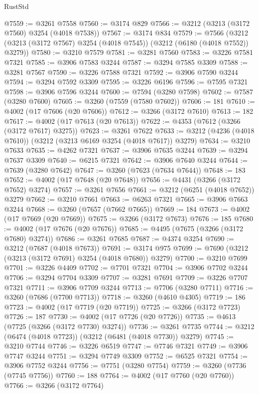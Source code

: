 \begin{lexlean}{RustStd}
\begin{coremodule}
@7559 := @3261 @7558
@7560 := @3174 @829
@7566 := @3212 (@3213 (@3172 @7560) @3254 (@4018 @7538))
@7567 := @3174 @834
@7579 := @7566 (@3212 (@3213 (@3172 @7567) @3254 (@4018 @7545)) (@3212 (@6180 (@4018 @7552)) @3279))
@7580 := @3210 @7579
@7581 := @3281 @7560
@7583 := @3226 @7581 @7321
@7585 := @3906 @7583 @3244
@7587 := @3294 @7585 @3309
@7588 := @3281 @7567
@7590 := @3226 @7588 @7321
@7592 := @3906 @7590 @3244
@7594 := @3294 @7592 @3309
@7595 := @3226 @6196
@7596 := @7595 @7321
@7598 := @3906 @7596 @3244
@7600 := @7594 (@3280 @7598)
@7602 := @7587 (@3280 @7600)
@7605 := @3260 (@7559 (@7580 @7602))
@7606 := 181
@7610 := @4002 (@17 @7606 (@20 @7606))
@7612 := @3266 (@3172 @7610)
@7613 := 182
@7617 := @4002 (@17 @7613 (@20 @7613))
@7622 := @4353 (@7612 (@3266 (@3172 @7617) @3275))
@7623 := @3261 @7622
@7633 := @3212 (@4236 (@4018 @7610)) (@3212 (@3213 @6169 @3254 (@4018 @7617)) @3279)
@7634 := @3210 @7633
@7635 := @4262 @7321
@7637 := @3906 @7635 @3244
@7639 := @3294 @7637 @3309
@7640 := @6215 @7321
@7642 := @3906 @7640 @3244
@7644 := @7639 (@3280 @7642)
@7647 := @3260 (@7623 (@7634 @7644))
@7648 := 183
@7652 := @4002 (@17 @7648 (@20 @7648))
@7656 := @4431 (@3266 (@3172 @7652) @3274)
@7657 := @3261 @7656
@7661 := @3212 (@6251 (@4018 @7652)) @3279
@7662 := @3210 @7661
@7663 := @6263 @7321
@7665 := @3906 @7663 @3244
@7668 := @3260 (@7657 (@7662 @7665))
@7669 := 184
@7673 := @4002 (@17 @7669 (@20 @7669))
@7675 := @3266 (@3172 @7673)
@7676 := 185
@7680 := @4002 (@17 @7676 (@20 @7676))
@7685 := @4495 (@7675 (@3266 (@3172 @7680) @3274))
@7686 := @3261 @7685
@7687 := @4374 @3254
@7690 := @3212 (@7687 (@4018 @7673))
@7691 := @3174 @975
@7699 := @7690 (@3212 (@3213 (@3172 @7691) @3254 (@4018 @7680)) @3279)
@7700 := @3210 @7699
@7701 := @3226 @4409
@7702 := @7701 @7321
@7704 := @3906 @7702 @3244
@7706 := @3294 @7704 @3309
@7707 := @3281 @7691
@7709 := @3226 @7707 @7321
@7711 := @3906 @7709 @3244
@7713 := @7706 (@3280 @7711)
@7716 := @3260 (@7686 (@7700 @7713))
@7718 := @3260 (@4610 @4305)
@7719 := 186
@7723 := @4002 (@17 @7719 (@20 @7719))
@7725 := @3266 (@3172 @7723)
@7726 := 187
@7730 := @4002 (@17 @7726 (@20 @7726))
@7735 := @4613 (@7725 (@3266 (@3172 @7730) @3274))
@7736 := @3261 @7735
@7744 := @3212 (@6474 (@4018 @7723)) (@3212 (@6481 (@4018 @7730)) @3279)
@7745 := @3210 @7744
@7746 := @3226 @6519
@7747 := @7746 @7321
@7749 := @3906 @7747 @3244
@7751 := @3294 @7749 @3309
@7752 := @6525 @7321
@7754 := @3906 @7752 @3244
@7756 := @7751 (@3280 @7754)
@7759 := @3260 (@7736 (@7745 @7756))
@7760 := 188
@7764 := @4002 (@17 @7760 (@20 @7760))
@7766 := @3266 (@3172 @7764)

\end{coremodule}
\end{lexlean}
